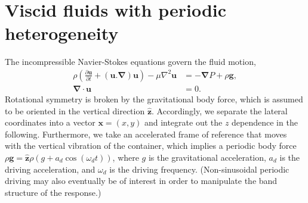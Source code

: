\documentclass[aps,pre,amsmath,amssymb,floatfix,onecolumn,notitlepage,10pt]{revtex4-1}
\begin{document}
\section{Viscid fluids with periodic heterogeneity}
The incompressible Navier-Stokes equations govern the fluid motion,
\begin{align}
\rho \left(\frac{\partial \mathbf{u}}{\partial t} + (\mathbf{u}.\bm{\nabla})\mathbf{u}\right) - \mu \nabla^2 \mathbf{u} &= -\bm{\nabla}P + \rho \mathbf{g}, \label{ns} \\
\bm{\nabla} \cdot \mathbf{u} &= 0. \label{incompressible}
\end{align}
Rotational symmetry is broken by the gravitational body force, which is assumed to be oriented in the vertical direction $\hat{\mathbf{z}}$. Accordingly, we separate the lateral coordinates into a vector $\mathbf{x}=(x,y)$ and integrate out the $z$ dependence in the following. Furthermore, we take an accelerated frame of reference that moves with the vertical vibration of the container, which implies a periodic body force $\rho \mathbf{g} = \hat{\mathbf{z}}\rho (g + a_d\cos(\omega_d t))$, where $g$ is the gravitational acceleration, $a_d$ is the driving acceleration, and $\omega_d$ is the driving frequency. (Non-sinusoidal periodic driving may also eventually be of interest in order to manipulate the band structure of the response.)
\end{document}
